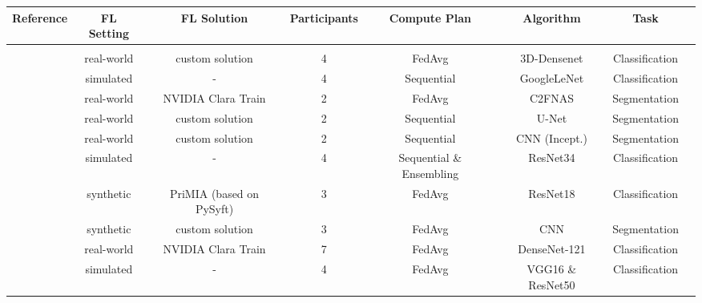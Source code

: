 \begin{table}
\begin{adjustbox}{width=1.0\textheight}
  \centering
  \begin{tabular}{cccccccc}
    Reference & FL Setting & FL Solution & Participants & Compute Plan & Algorithm & Task \\
    \hline \\[-2.5ex] %
    \cite{Xu2020ADiagnosis}                             & real-world & custom solution          & 4             & FedAvg                    & 3D-Densenet       & Classification \\
    \cite{Balachandar2020AccountingImaging}             & simulated  & -                        & 4             & Sequential                & GoogleLeNet       & Classification \\
    \cite{Wang2020AutomatedLearning}                    & real-world & NVIDIA Clara Train   & 2             & FedAvg                    & C2FNAS            & Segmentation \\
    \cite{Remedios2020DistributedSegmentation}          & real-world & custom solution          & 2             & Sequential                & U-Net             & Segmentation  \\
    \cite{Remedios2019DistributedInjury}                & real-world & custom solution          & 2             & Sequential                & CNN (Incept.)     & Segmentation  \\
    \cite{Chang2018DistributedImaging}                  & simulated  & -                        & 4             & Sequential \& Ensembling  & ResNet34          & Classification \\
    \cite{Kaissis2021End-to-endImaging}                 & synthetic  & PriMIA (based on PySyft) & 3             & FedAvg                    & ResNet18          & Classification  \\
    \cite{Dou2021FederatedStudy}                        & synthetic  & custom solution          & 3             & FedAvg                    & CNN               & Segmentation \\
    \cite{Roth2020FederatedImplementation}              & real-world & NVIDIA Clara Train   & 7             & FedAvg                    & DenseNet-121      & Classification \\
    \cite{Feki2021FederatedImages}                      & simulated  & -                        & 4             & FedAvg                    & VGG16 \& ResNet50 & Classification \\    

\end{tabular}
\end{adjustbox}
\end{table}
